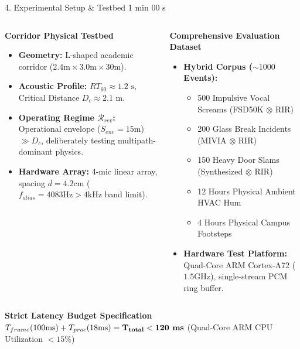 \documentclass[aspectratio=169,10pt]{beamer}
\begin{document}
\begin{frame}{4. Experimental Setup \& Testbed \hfill {\small\color{gray}1 min 00 s}}
\begin{columns}[T]
\begin{block}{\textbf{Corridor Physical Testbed}}
\scriptsize
\begin{itemize}
    \item \textbf{Geometry:} L-shaped academic corridor ($2.4\text{m} \times 3.0\text{m} \times 30\text{m}$).
    \item \textbf{Acoustic Profile:} $RT_{60} \approx 1.2\text{ s}$, Critical Distance $D_c \approx 2.1\text{ m}$.
    \item \textbf{Operating Regime $\mathcal{R}_{rev}$:} Operational envelope ($S_{env} = 15\text{m}$) $\gg D_c$, deliberately testing multipath-dominant physics.
    \item \textbf{Hardware Array:} 4-mic linear array, spacing $d = 4.2\text{cm}$ ($f_{alias} = 4083\text{Hz} > 4\text{kHz}$ band limit).
\end{itemize}
\end{block}

\begin{block}{\textbf{Comprehensive Evaluation Dataset}}
\scriptsize
\begin{itemize}
    \item \textbf{Hybrid Corpus ($\sim 1000$ Events):}
    \begin{itemize}
        \tiny
        \item 500 Impulsive Vocal Screams (FSD50K $\otimes$ RIR)
        \item 200 Glass Break Incidents (MIVIA $\otimes$ RIR)
        \item 150 Heavy Door Slams (Synthesized $\otimes$ RIR)
        \item 12 Hours Physical Ambient HVAC Hum
        \item 4 Hours Physical Campus Footsteps
    \end{itemize}
    \item \textbf{Hardware Test Platform:} Quad-Core ARM Cortex-A72 ($1.5\text{GHz}$), single-stream PCM ring buffer.
\end{itemize}
\end{block}
\end{columns}

\vspace{0.4em}
\begin{block}{\textbf{Strict Latency Budget Specification}}
\centering\footnotesize
$T_{frame} (100\text{ms}) + T_{proc} (18\text{ms}) = \mathbf{T_{total} < 120\text{\textbf{ ms}}}$ (Quad-Core ARM CPU Utilization $<15\%$)
\end{block}
\end{frame}
\end{document}
